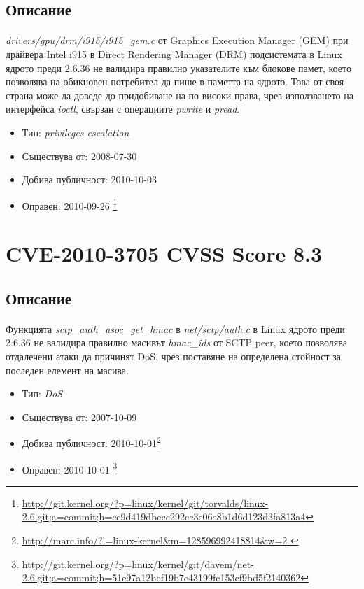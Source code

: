 \documentclass[a4paper,12pt,leqno]{article}
\begin{document}
\subsection{Описание}
\paragraph{}
\textit{drivers/gpu/drm/i915/i915\_gem.c} от Graphics Execution Manager (GEM) при драйвера Intel i915 в Direct Rendering Manager (DRM) подсистемата в Linux ядрото преди 2.6.36 не валидира правилно указателите към блокове памет, което позволява на обикновен потребител да пише в паметта на ядрото. Това от своя страна може да доведе до придобиване на по-високи права, чрез използването на интерфейса \textit{ioctl}, свързан с операциите \textit{pwrite} и \textit{pread}.

\begin{itemize}
    \item Тип: \textit{privileges escalation}
    \item Съществува от: 2008-07-30
  	\item Добива публичност: 2010-10-03
    \item Оправен: 2010-09-26 \footnote{\url{http://git.kernel.org/?p=linux/kernel/git/torvalds/linux-2.6.git;a=commit;h=ce9d419dbecc292cc3e06e8b1d6d123d3fa813a4}}
\end{itemize}


\section{CVE-2010-3705 CVSS Score 8.3}
\subsection{Описание}
\paragraph{}
Функцията \textit{sctp\_auth\_asoc\_get\_hmac} в\textit{ net/sctp/auth.c} в Linux ядрото преди 2.6.36 не валидира правилно масивът \textit{hmac\_ids} от SCTP peer, което позволява отдалечени атаки да причинят DoS, чрез поставяне на определена стойност за последен елемент на масива.

\begin{itemize}
    \item Тип: \textit{DoS}
    \item Съществува от: 2007-10-09
  	\item Добива публичност: 2010-10-01\footnote{\url{http://marc.info/?l=linux-kernel&m=128596992418814&w=2	}}
    \item Оправен: 2010-10-01 \footnote{\url{http://git.kernel.org/?p=linux/kernel/git/davem/net-2.6.git;a=commit;h=51e97a12bef19b7e43199fc153cf9bd5f2140362}}
\end{itemize}
\end{document}
